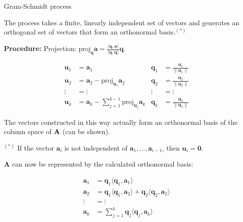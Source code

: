 \documentclass[11pt,compress,t,notes=noshow, xcolor=table]{beamer}
\begin{document}
\begin{vbframe}{Gram-Schmidt process}

The process takes a finite, linearly independent set of vectors and generates an orthogonal set of vectors that form an orthonormal basis.$^{(*)}$

\vspace*{0.2cm}
\begin{footnotesize}
\textbf{Procedure:}
Projection: $\text{proj}_{\bm{q}} \bm{a} = \frac{\langle \bm{q}, \bm{a} \rangle}{\langle \bm{q}, \bm{q} \rangle} \bm{q}$.
\vspace*{-0.1cm}

\begin{align*}
\bm{u}_1 & = \bm{a}_1                                     & \bm{q}_1 & = \frac{\bm{u}_1}{\|\bm{u}_1\|}\\
\bm{u}_2 & = \bm{a}_2 - \text{proj}_{\bm{u}_1} \bm{a}_2   & \bm{q}_2 & = \frac{\bm{u}_2}{\|\bm{u}_2\|}\\
\vdots   & = \vdots                                       & \vdots   & = \vdots \\
\bm{u}_k & = \bm{a}_k - \sum_{j=1}^{k-1} \text{proj}_{\bm{u}_j} \bm{a}_k & \bm{q}_k & = \frac{\bm{u}_k}{\|\bm{u}_k\|}
\end{align*}
\end{footnotesize}
The vectors constructed in this way actually form an orthonormal basis of the column space of $\mathbf{A}$ (can be shown).
\vfill

\begin{footnotesize}
$^{(*)}$ If the vector $\bm{a}_i$ is not independent of $\bm{a}_1, ..., \bm{a}_{i - 1}$, then $\bm{u}_i = \bm{0}$. %
\end{footnotesize}

% 


\framebreak

$\bm{A}$ can now be represented by the calculated orthonormal basis:

\begin{align*}
  \bm{a}_1 & = \bm{q}_1 \langle \bm{q}_1, \bm{a}_1 \rangle \\
  \bm{a}_2 & = \bm{q}_1 \langle \bm{q}_1, \bm{a}_2 \rangle + \bm{q}_2 \langle \bm{q}_2, \bm{a}_2 \rangle \\
  \vdots   & = \vdots \\
  \bm{a}_k & = \sum_{j=1}^{k} \bm{q}_j \langle \bm{q}_j, \bm{a}_k \rangle
\end{align*}


\end{vbframe}
\end{document}

